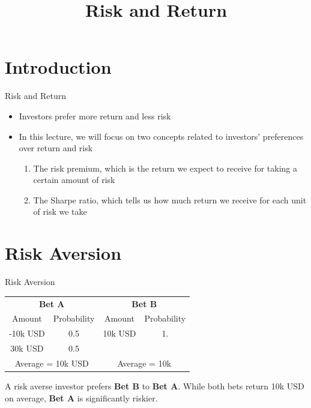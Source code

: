 \documentclass{beamer}
\title{Risk and Return}
\begin{document}
\maketitle

\section{Introduction}
\begin{frame}{Risk and Return}
	\begin{itemize}
		\item Investors prefer more return and less risk
		\item In this lecture, we will focus on two concepts related to investors' preferences over return and risk
		\begin{enumerate}
			\item The risk premium, which is the return we expect to receive for taking a certain amount of risk
			\item The Sharpe ratio, which tells us how much return we receive for each unit of risk we take
		\end{enumerate}
	\end{itemize}
\end{frame}

\section{Risk Aversion}

\begin{frame}{Risk Aversion}
	\begin{center}
		\renewcommand{\arraystretch}{1.5}
		\begin{tabular}{cc|cc}
			\multicolumn{2}{c}{\textbf{Bet A}} & \multicolumn{2}{c}{\textbf{Bet B}} \\
			Amount & Probability & Amount & Probability \\ \hline
			-10k USD & 0.5 & 10k USD & 1. \\
			30k USD & 0.5 & & \\ \hline
			\multicolumn{2}{c}{Average = 10k USD} & \multicolumn{2}{c}{Average = 10k}
		\end{tabular}
	\end{center}
\begin{center}
A risk averse investor prefers \textbf{Bet B} to \textbf{Bet A}. While both bets return 10k USD on average, \textbf{Bet A} is significantly riskier.
\end{center}
\end{frame}
\end{document}
